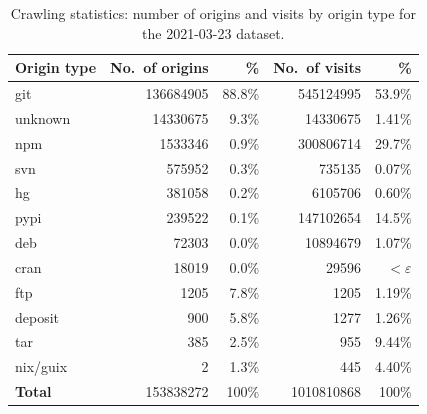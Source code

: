 \begin{table}
  \caption{Crawling statistics: number of origins and visits by origin type for
  the 2021-03-23 dataset.}%
  \label{tab:visits-by-type}
  \centering
  \begin{tabular}{l|rr|rr}
    \textbf{Origin type}
    & \textbf{No.~of origins} & \textbf{\%}
    & \textbf{No.~of visits} & \textbf{\%} \\
    \hline
    git      & \num{136684905} & 88.8\% & \num{545124995} & 53.9\% \\
    unknown  & \num{14330675}  & 9.3\%  & \num{14330675 } & 1.41\% \\
    npm      & \num{1533346}   & 0.9\%  & \num{300806714} & 29.7\% \\
    svn      & \num{575952}    & 0.3\%  & \num{735135   } & 0.07\% \\
    hg       & \num{381058}    & 0.2\%  & \num{6105706  } & 0.60\% \\
    pypi     & \num{239522}    & 0.1\%  & \num{147102654} & 14.5\% \\
    deb      & \num{72303}     & 0.0\%  & \num{10894679 } & 1.07\% \\
    cran     & \num{18019}     & 0.0\%  & \num{29596    } & $<\varepsilon$ \\
    ftp      & \num{1205}      & 7.8\%  & \num{1205     } & 1.19\% \\
    deposit  & \num{900}       & 5.8\%  & \num{1277     } & 1.26\% \\
    tar      & \num{385}       & 2.5\%  & \num{955      } & 9.44\% \\
    nix/guix & \num{2}         & 1.3\%  & \num{445      } & 4.40\% \\
    \hline
    \textbf{Total}            & \num{153838272} & 100\%       & \num{1010810868} & 100\% \\
  \end{tabular}
\end{table}

